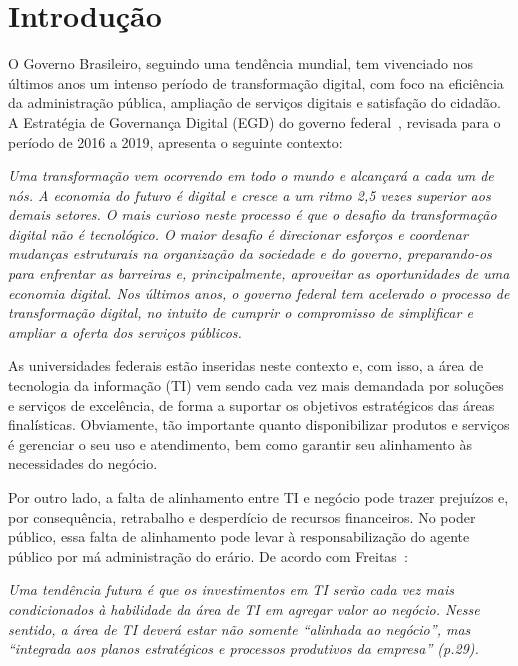\chapter{Introdução}
\label{cap:introducao}

O Governo Brasileiro, seguindo uma tendência mundial, tem vivenciado nos últimos anos um intenso período de transformação digital, com foco na eficiência da administração pública, ampliação de serviços digitais e satisfação do cidadão. A Estratégia de Governança Digital (EGD) do governo federal~\cite{EGD2018}, revisada para o período de 2016 a 2019, apresenta o seguinte contexto:

\begin{citacao}
  \textit{Uma transformação vem ocorrendo em todo o mundo e alcançará a cada um de nós. A economia do futuro é digital e cresce a um ritmo 2,5 vezes superior aos demais setores.
O mais curioso neste processo é que o desafio da transformação digital não é tecnológico. O maior desafio é direcionar esforços e coordenar mudanças estruturais na organização da sociedade e do governo, preparando-os para enfrentar as barreiras e, principalmente, aproveitar as oportunidades de uma economia digital.
Nos últimos anos, o governo federal tem acelerado o processo de transformação digital, no intuito de cumprir o compromisso de simplificar e ampliar a oferta dos serviços públicos.}
\end{citacao}

As universidades federais estão inseridas neste contexto e, com isso, a área de tecnologia da informação (TI) vem sendo cada vez mais demandada por soluções e serviços de excelência, de forma a suportar os objetivos estratégicos das áreas finalísticas. Obviamente, tão importante quanto disponibilizar produtos e serviços é gerenciar o seu uso e atendimento, bem como garantir seu alinhamento às necessidades do negócio.

Por outro lado, a falta de alinhamento entre TI e negócio pode trazer prejuízos e, por consequência, retrabalho e desperdício de recursos financeiros. No poder público, essa falta de alinhamento pode levar à responsabilização do agente público por má administração do erário. De acordo com Freitas~\cite{Freitas2013}:

\begin{citacao}
  \textit{Uma tendência futura é que os investimentos em TI serão cada vez mais condicionados à habilidade da área de TI em agregar valor ao negócio. Nesse sentido, a área de TI deverá estar não somente ``alinhada ao negócio'', mas ``integrada aos planos estratégicos e processos produtivos da empresa'' (p.29).}
\end{citacao}

